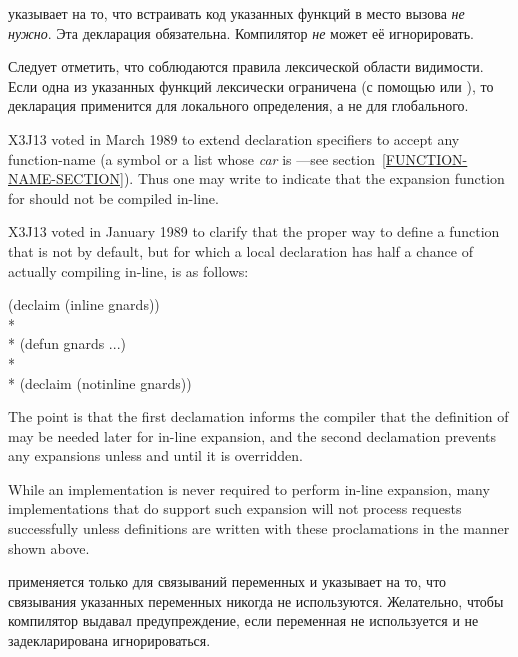 \begin{flushdesc}
\item[\cdf{notinline}]
указывает на то, что встраивать код указанных функций в место вызова \emph{не
  нужно}.
Эта декларация обязательна.
Компилятор \emph{не} может её игнорировать.

Следует отметить, что соблюдаются правила лексической области видимости. Если
одна из указанных функций лексически ограничена (с помощью  или
), то декларация применится для локального определения, а не для
глобального.
\begin{newer}
X3J13 voted in March 1989  to extend 
declaration specifiers
to accept any function-name (a symbol or a list
whose \emph{car} is ---see section~\ref{FUNCTION-NAME-SECTION}).
Thus one may write  to indicate
that the 
expansion function for  should not be compiled in-line.
\end{newer}

\begin{new}
X3J13 voted in January 1989
to clarify that the proper way to define a function 
that is not  by default, but for which a local
declaration  has half a chance of
actually compiling  in-line, is as follows:
\begin{lisp}
(declaim (inline gnards)) \\*
\\*
(defun gnards ...) \\*
\\*
(declaim (notinline gnards))
\end{lisp}
The point is that the first declamation informs the compiler that
the definition of  may be needed later for in-line expansion,
and the second declamation prevents any expansions unless and until it is
overridden.

While an implementation is never required to perform in-line expansion,
many implementations that do support such expansion will not
process  requests successfully unless definitions are
written with these proclamations in the manner shown above.
\end{new}

\item[\cdf{ignore}]
 применяется только для
связываний переменных и указывает на то, что связывания указанных переменных
никогда не используются. Желательно, чтобы компилятор выдавал предупреждение, если
переменная не используется и не задекларирована игнорироваться.


\end{flushdesc}
